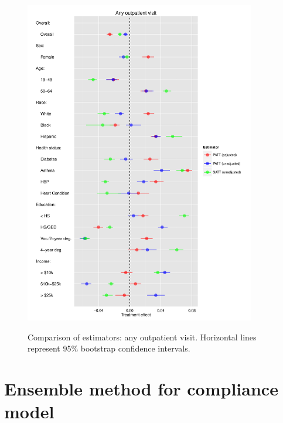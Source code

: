 \documentclass[12pt]{article}
\begin{document}
\begin{appendices}
\begin{figure}[htbp]
\begin{center}
\includegraphics[width = 0.9\textwidth]{any-out-plot.pdf}
\label{fig:any-out-plot}
    \caption{Comparison of estimators: any outpatient visit. Horizontal lines represent 95\% bootstrap confidence intervals.}
\end{center}
\end{figure}

\section{Ensemble method for compliance model}


\end{appendices}
\end{document}
